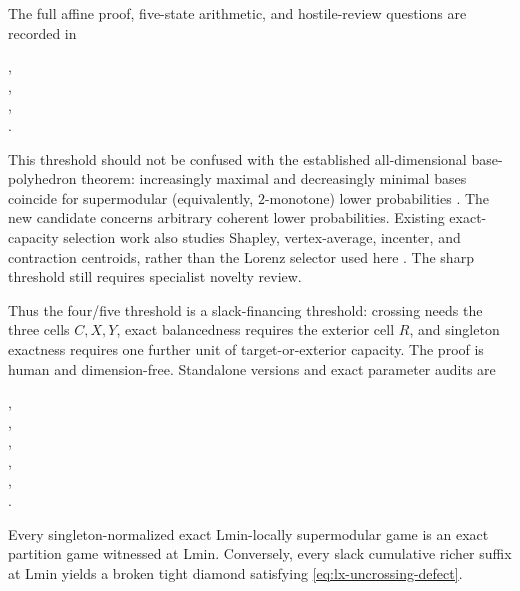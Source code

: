 The full affine proof, five-state arithmetic, and hostile-review questions
are recorded in
\begin{center}
\small{},\\[-2pt]
\small{},\\[-2pt]
\small{},\\[-2pt]
\small{}.
\end{center}
This threshold should not be confused with the established all-dimensional
base-polyhedron theorem: increasingly maximal and decreasingly minimal bases
coincide for supermodular (equivalently, $2$-monotone) lower probabilities
\citep{Fujishige1980,FrankMurota2022}.  The new candidate concerns arbitrary
coherent lower probabilities.  Existing exact-capacity selection work also
studies Shapley, vertex-average, incenter, and contraction centroids, rather
than the Lorenz selector used here \citep{MirandaMontes2023}.  The sharp
threshold still requires specialist novelty review.

Thus the four/five threshold is a slack-financing threshold: crossing needs
the three cells $C,X,Y$, exact balancedness requires the exterior cell $R$,
and singleton exactness requires one further unit of target-or-exterior
capacity. The proof is human and dimension-free. Standalone versions and
exact parameter audits are
\begin{center}
\small{},\\[-2pt]
\small{},\\[-2pt]
\small{},\\[-2pt]
\small{},\\[-2pt]
\small{},\\[-2pt]
\small{}.
\end{center}

\begin{corollary}
\label{cor:lx-local-supermodular-lmin}
Every singleton-normalized exact Lmin-locally supermodular game is an exact
partition game witnessed at Lmin.  Conversely, every slack cumulative richer
suffix at Lmin yields a broken tight diamond satisfying
\eqref{eq:lx-uncrossing-defect}.
\end{corollary}

